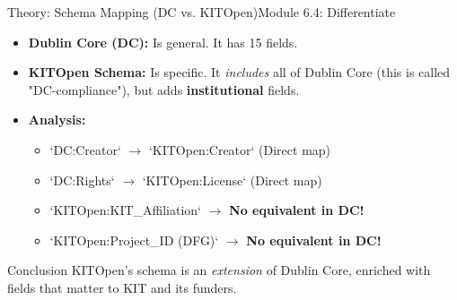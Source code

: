 \begin{frame}{Theory: Schema Mapping (DC vs. KITOpen)}{Module 6.4: Differentiate}
    \begin{itemize}
        \item \textbf{Dublin Core (DC):} Is general. It has 15 fields.
        \pause
        \item \textbf{KITOpen Schema:} Is specific. It \textit{includes} all of Dublin Core (this is called "DC-compliance"), but adds \textbf{institutional} fields.
        \pause
        \item \textbf{Analysis:}
        \begin{itemize}
            \item `DC:Creator` $\rightarrow$ `KITOpen:Creator` (Direct map)
            \item `DC:Rights` $\rightarrow$ `KITOpen:License` (Direct map)
            \pause
            \item `KITOpen:KIT\_Affiliation` $\rightarrow$ \textbf{No equivalent in DC!}
            \item `KITOpen:Project\_ID (DFG)` $\rightarrow$ \textbf{No equivalent in DC!}
        \end{itemize}
    \end{itemize}
    \pause
    \begin{block}{Conclusion}
        KITOpen's schema is an \emph{extension} of Dublin Core, enriched with fields that matter to KIT and its funders.
    \end{block}
\end{frame}

